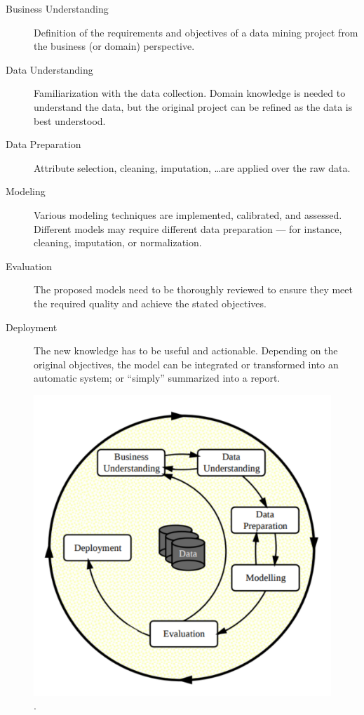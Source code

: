 \begin{description}
    \item[Business Understanding] Definition of the requirements and objectives of a data mining project
        from the business (or domain) perspective.
    \item[Data Understanding] Familiarization with the data collection. Domain knowledge
        is needed to understand the data, but the original project can be refined as the data is best understood.
    \item[Data Preparation] Attribute selection, cleaning, imputation, \ldots are applied over the raw data.
    \item[Modeling] Various modeling techniques are implemented, calibrated, and assessed. Different models may require different data preparation ---
    for instance, cleaning, imputation, or normalization.
    \item[Evaluation] The proposed models need to be thoroughly reviewed to ensure they meet the required quality and achieve the stated
    objectives.
    \item[Deployment] The new knowledge has to be useful and actionable.
    Depending on the original objectives, the model can be integrated 
    or transformed into an automatic system; or ``simply'' summarized into a report.
\end{description}

\begin{figure}[htb]
    \centering
    \includegraphics[width=0.8\linewidth]{images/1_introduction/crisp-dm.pdf}
    \caption{.}
    \label{fig:crispdm}
\end{figure}

